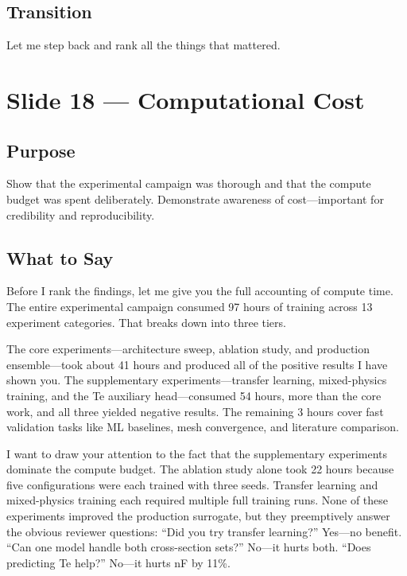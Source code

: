 \documentclass[12pt,a4paper]{article}
\begin{document}
\subsection*{Transition}
Let me step back and rank all the things that mattered.

\clearpage

\section{Slide 18 --- Computational Cost}
\label{sec:slide18}

\subsection*{Purpose}
Show that the experimental campaign was thorough and that the
compute budget was spent deliberately.  Demonstrate awareness of
cost---important for credibility and reproducibility.

\subsection*{What to Say}

Before I rank the findings, let me give you the full accounting of
compute time.  The entire experimental campaign consumed 97 hours
of training across 13 experiment categories.  That breaks down into
three tiers.

The core experiments---architecture sweep, ablation study, and
production ensemble---took about 41 hours and produced all of the
positive results I have shown you.  The supplementary
experiments---transfer learning, mixed-physics training, and the
Te auxiliary head---consumed 54 hours, more than the core work, and
all three yielded negative results.  The remaining 3 hours cover
fast validation tasks like ML baselines, mesh convergence, and
literature comparison.

I want to draw your attention to the fact that the supplementary
experiments dominate the compute budget.  The ablation study alone
took 22 hours because five configurations were each trained with
three seeds.  Transfer learning and mixed-physics training each
required multiple full training runs.  None of these experiments
improved the production surrogate, but they preemptively answer
the obvious reviewer questions: ``Did you try transfer learning?''
Yes---no benefit.  ``Can one model handle both cross-section sets?''
No---it hurts both.  ``Does predicting Te help?'' No---it hurts nF
by 11\%.
\end{document}
